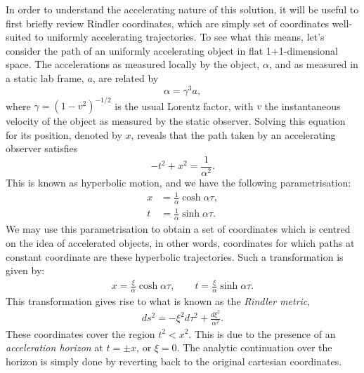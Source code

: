 \documentclass[
twoside,
openright,
frontopenright,
]{dmathesis}
\newcommand{\nn}{\nonumber}
\begin{document}
In order to understand the accelerating nature of this solution, it will be
useful to first briefly review Rindler coordinates, which are simply set of
coordinates well-suited to uniformly accelerating trajectories. To see what this
means, let's consider the path of an uniformly accelerating object in flat
1+1-dimensional space. The accelerations as measured locally by the object,
$\alpha$, and as measured in a static lab frame, $a$, are related by
\begin{equation}
  \alpha = \gamma^3a,
\end{equation}
where $\gamma = (1-v^2)^{-1/2}$ is the usual Lorentz factor, with $v$ the
instantaneous velocity of the object as measured by the static observer. Solving
this equation for its position, denoted by $x$, reveals that the path taken by
an accelerating observer satisfies
\begin{equation}
  -t^2+x^2=\frac{1}{\alpha^2}.
\end{equation}
This is known as hyperbolic motion, and we have the following parametrisation:
\begin{align}
  \label{eq:trajectory}
  x &= \frac{1}{\alpha} \cosh \alpha \tau,\nn\\
  t &= \frac{1}{\alpha} \sinh \alpha \tau.
\end{align}
We may use this parametrisation to obtain a set of coordinates which is centred
on the idea of accelerated objects, in other words, coordinates for which paths
at constant coordinate are these hyperbolic trajectories. Such a transformation
is given by:
\begin{align}
  x = \frac{\xi}{\alpha} \cosh \alpha \tau,\qquad t = \frac{\xi}{\alpha} \sinh
  \alpha \tau.
\end{align}
This transformation gives rise to what is known as the \emph{Rindler metric},
\begin{align}
   ds^2 = -\xi^2 d\tau^2 + \frac{d\xi^2}{\alpha^2}.
\end{align}
These coordinates cover the region $t^2<x^2$. This is due to the presence of an
\emph{acceleration horizon} at $t = \pm x$, or $\xi = 0$. The analytic
continuation over the horizon is simply done by reverting back to the original
cartesian coordinates.
\end{document}
